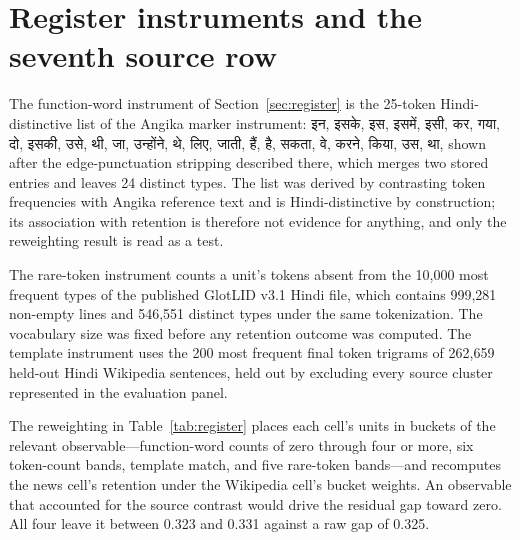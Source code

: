 \documentclass[final]{clv2025}
\newcommand{\dev}[1]{{\devfont #1}}
\begin{document}
\FloatBarrier
\section{Register instruments and the seventh source row}\label{app:register}

The function-word instrument of Section~\ref{sec:register} is the 25-token Hindi-distinctive list of the Angika marker instrument: \dev{इन}, \dev{इसके}, \dev{इस}, \dev{इसमें}, \dev{इसी}, \dev{कर}, \dev{गया}, \dev{दो}, \dev{इसकी}, \dev{उसे}, \dev{थी}, \dev{जा}, \dev{उन्होंने}, \dev{थे}, \dev{लिए}, \dev{जाती}, \dev{हैं}, \dev{है}, \dev{सकता}, \dev{वे}, \dev{करने}, \dev{किया}, \dev{उस}, \dev{था}, shown after the edge-punctuation stripping described there, which merges two stored entries and leaves 24 distinct types. The list was derived by contrasting token frequencies with Angika reference text and is Hindi-distinctive by construction; its association with retention is therefore not evidence for anything, and only the reweighting result is read as a test.

The rare-token instrument counts a unit's tokens absent from the 10,000 most frequent types of the published GlotLID v3.1 Hindi file, which contains 999,281 non-empty lines and 546,551 distinct types under the same tokenization. The vocabulary size was fixed before any retention outcome was computed. The template instrument uses the 200 most frequent final token trigrams of 262,659 held-out Hindi Wikipedia sentences, held out by excluding every source cluster represented in the evaluation panel.

The reweighting in Table~\ref{tab:register} places each cell's units in buckets of the relevant observable---function-word counts of zero through four or more, six token-count bands, template match, and five rare-token bands---and recomputes the news cell's retention under the Wikipedia cell's bucket weights. An observable that accounted for the source contrast would drive the residual gap toward zero. All four leave it between 0.323 and 0.331 against a raw gap of 0.325.
\end{document}
